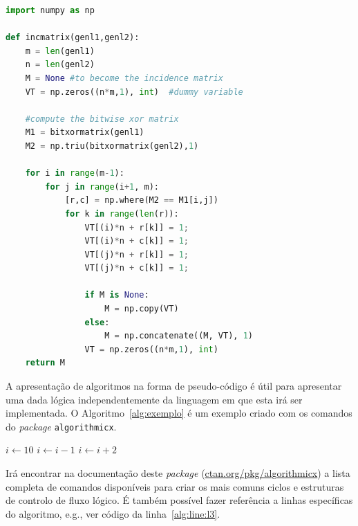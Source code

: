 \begin{minipage}{0.9\linewidth}
\begin{lstlisting}[language=Python, caption=Exemplo longo em Python., label=lst:examplo2]
import numpy as np
    
def incmatrix(genl1,genl2):
    m = len(genl1)
    n = len(genl2)
    M = None #to become the incidence matrix
    VT = np.zeros((n*m,1), int)  #dummy variable
    
    #compute the bitwise xor matrix
    M1 = bitxormatrix(genl1)
    M2 = np.triu(bitxormatrix(genl2),1) 

    for i in range(m-1):
        for j in range(i+1, m):
            [r,c] = np.where(M2 == M1[i,j])
            for k in range(len(r)):
                VT[(i)*n + r[k]] = 1;
                VT[(i)*n + c[k]] = 1;
                VT[(j)*n + r[k]] = 1;
                VT[(j)*n + c[k]] = 1;
                
                if M is None:
                    M = np.copy(VT)
                else:
                    M = np.concatenate((M, VT), 1)               
                VT = np.zeros((n*m,1), int)  
    return M
\end{lstlisting}
\end{minipage}

A apresentação de algoritmos na forma de pseudo-código é útil para apresentar uma dada lógica independentemente da linguagem em que esta irá ser implementada. O Algoritmo~\ref{alg:exemplo} é um exemplo criado com os comandos do \textit{package} \verb|algorithmicx|. 

\begin{algorithm}[hbt!]
\caption{Exemplo de um algoritmo}
\label{alg:exemplo}
\hrulefill
\begin{algorithmic}[1]
\State $i \gets 10$
    \State $i \gets i-1$ 	\label{alg:line:l3}
\Else
        \State $i \gets i+2$ 
    \EndIf
\EndIf 
\end{algorithmic}
\hrulefill
\end{algorithm}

Irá encontrar na documentação deste \textit{package} (\url{ctan.org/pkg/algorithmicx}) a lista completa de comandos disponíveis para criar os mais comuns ciclos e estruturas de controlo de fluxo lógico. É também possível fazer referência a linhas específicas do algoritmo, e.g., ver código da linha~\ref{alg:line:l3}.


